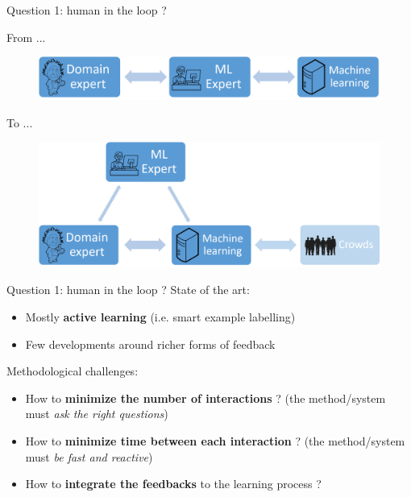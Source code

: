\documentclass{beamer}
\begin{document}
\begin{frame}{Question 1: human in the loop ?}
	
	From ... 
	
	\begin{figure}[h]
		\includegraphics[scale=0.25]{images/without_expert.png}
	\end{figure}
	
	To ... 
	
	\begin{figure}
		\includegraphics[scale=0.25]{images/with_expert_and_crowd.png}
	\end{figure}	
\end{frame}

\begin{frame}{Question 1: human in the loop ?}
	State of the art:
	\begin{itemize}
		\item Mostly \textbf{active learning} (i.e. smart example labelling)
		\item Few developments around richer forms of feedback
	\end{itemize}		
	\vfill
	Methodological challenges:
	\begin{itemize}
		\item How to \textbf{minimize the number of interactions} ? {\small(the method/system must \textit{ask the right questions})}
		\item How to \textbf{minimize time between each interaction} ? {\small(the method/system must \textit{be fast and reactive})}
		\item How to \textbf{integrate the feedbacks} to the learning process ?
	\end{itemize}

\end{frame}
\end{document}
